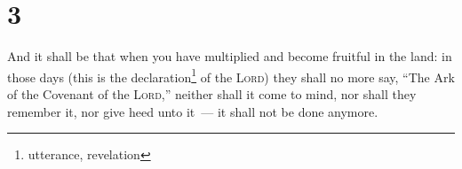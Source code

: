\section{3}\label{Jeremiah 3}
\begin{enumerate}[align=center]
     And it shall be that when you have multiplied and become fruitful in the land: in those days (this is the declaration\footnote{utterance, revelation} of the \textsc{Lord}) they shall no more say, ``The Ark of the Covenant of the \textsc{Lord},'' neither shall it come to mind, nor shall they remember it, nor give heed unto it~--- it shall not be done anymore.%
\end{enumerate}

